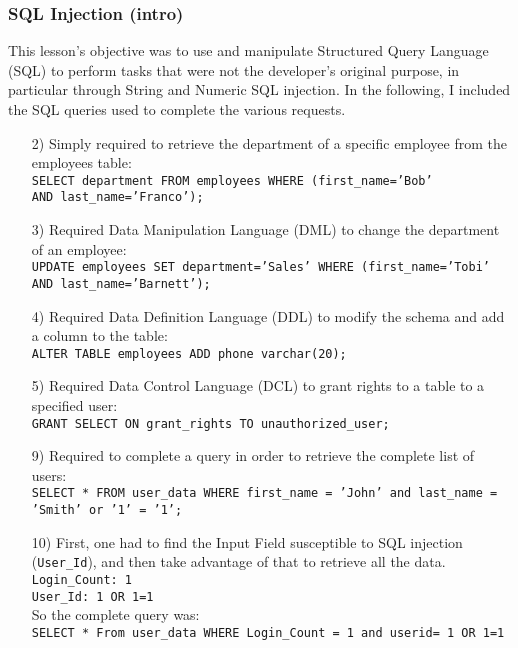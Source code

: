 \documentclass{article}
\begin{document}
\subsubsection{SQL Injection (intro)}
This lesson's objective was to use and manipulate Structured Query Language (SQL) to perform tasks that were not the developer's original purpose, in particular through String and Numeric SQL injection.
In the following, I included the SQL queries used to complete the various requests.
\begin{itemize}
    \item[2)] {Simply required to retrieve the department of a specific employee from the employees table:\\
    \texttt{SELECT department FROM employees WHERE (first\_name='Bob'\\ AND last\_name='Franco');}}
    
    \item[3)] {Required Data Manipulation Language (DML) to change the department of an employee:\\
    \texttt{UPDATE employees SET department='Sales' WHERE (first\_name='Tobi' AND last\_name='Barnett');}}
    
    \item[4)] {Required Data Definition Language (DDL) to modify the schema and add a column to the table:\\
    \texttt{ALTER TABLE employees ADD phone varchar(20);}}
    
    \item[5)] {Required Data Control Language (DCL) to grant rights to a table to a specified user:\\
    \texttt{GRANT SELECT ON grant\_rights TO unauthorized\_user;}}
    
    \item[9)] {Required to complete a query in order to retrieve the complete list of users:\\
    \texttt{SELECT * FROM user\_data WHERE first\_name = 'John' and last\_name = 'Smith' or '1' = '1';}}
    
    \item[10)] {First, one had to find the Input Field susceptible to SQL injection (\texttt{User\_Id}), and then take advantage of that to retrieve all the data.\\
    \texttt{Login\_Count: 1\\User\_Id: 1 OR 1=1}\\
    So the complete query was:\\
    \texttt{SELECT * From user\_data WHERE Login\_Count = 1 and userid= 1 OR 1=1}}
    

\end{itemize}
\end{document}
